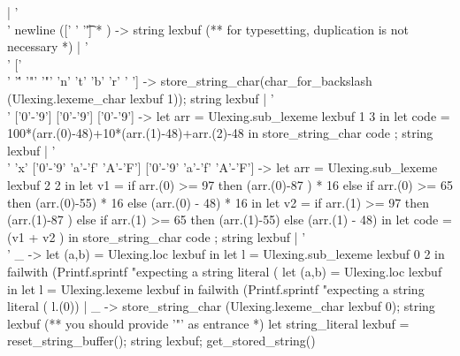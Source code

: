 \begin{enumerate}
\begin{enumerate}
\begin{bluecode}
  | '\\' newline ([' ' '\t'] * ) -> 
        string lexbuf
  (** for typesetting, duplication is not necessary *)
  | '\\' ['\\' '\'' '"' '"' 'n' 't' 'b' 'r' ' '] -> 
    store_string_char(char_for_backslash (Ulexing.lexeme_char lexbuf 1));
    string lexbuf 
  | '\\' ['0'-'9'] ['0'-'9'] ['0'-'9'] -> 
    let arr = Ulexing.sub_lexeme lexbuf 1 3 in 
    let code = 100*(arr.(0)-48)+10*(arr.(1)-48)+arr.(2)-48 in 
    store_string_char code ; 
    string lexbuf 
  | '\\' 'x' ['0'-'9' 'a'-'f' 'A'-'F'] ['0'-'9' 'a'-'f' 'A'-'F'] ->
    let arr = Ulexing.sub_lexeme lexbuf 2 2 in 
    let v1 = 
      if arr.(0) >= 97 
      then (arr.(0)-87 ) * 16 
      else if arr.(0) >= 65 
      then (arr.(0)-55) * 16 
      else (arr.(0) - 48) * 16 in
    let v2 = 
      if arr.(1) >= 97 
      then (arr.(1)-87 ) 
      else if arr.(1) >= 65 
      then (arr.(1)-55) 
      else (arr.(1) - 48) in 
    let code = (v1 + v2 ) in 
    store_string_char code ; 
    string lexbuf 
  | '\\' _ -> 
    let (a,b) = Ulexing.loc lexbuf in 
    let l = Ulexing.sub_lexeme lexbuf 0 2  in
    failwith 
    (Printf.sprintf 
       "expecting a string literal (%
    let (a,b) = Ulexing.loc lexbuf in 
    let l = Ulexing.lexeme lexbuf in
    failwith 
    (Printf.sprintf 
       "expecting a string literal (%
        l.(0))
  | _ -> 
    store_string_char (Ulexing.lexeme_char lexbuf 0);
    string lexbuf 
(** you should provide '"' as entrance *)
let string_literal lexbuf = 
  reset_string_buffer();
  string lexbuf;
  get_stored_string()
  
\end{bluecode}


% 
  \end{enumerate}
\end{enumerate}

